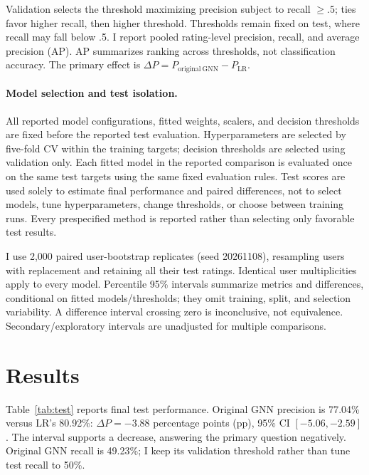 \documentclass{article}
\begin{document}
Validation selects the threshold maximizing precision subject to recall $\geq .5$; ties favor higher recall, then higher threshold. Thresholds remain fixed on test, where recall may fall below .5. I report pooled rating-level precision, recall, and average precision (AP). AP summarizes ranking across thresholds, not classification accuracy. The primary effect is $\Delta P=P_{\mathrm{original\ GNN}}-P_{\mathrm{LR}}$.

\paragraph{Model selection and test isolation.}
All reported model configurations, fitted weights, scalers, and decision thresholds are fixed before the reported test evaluation. Hyperparameters are selected by five-fold CV within the training targets; decision thresholds are selected using validation only. Each fitted model in the reported comparison is evaluated once on the same test targets using the same fixed evaluation rules. Test scores are used solely to estimate final performance and paired differences, not to select models, tune hyperparameters, change thresholds, or choose between training runs. Every prespecified method is reported rather than selecting only favorable test results.

I use 2,000 paired user-bootstrap replicates (seed 20261108), resampling users with replacement and retaining all their test ratings. Identical user multiplicities apply to every model. Percentile 95\% intervals summarize metrics and differences, conditional on fitted models/thresholds; they omit training, split, and selection variability. A difference interval crossing zero is inconclusive, not equivalence. Secondary/exploratory intervals are unadjusted for multiple comparisons.

\section{Results}
Table~\ref{tab:test} reports final test performance. Original GNN precision is 77.04\% versus LR's 80.92\%: $\Delta P=-3.88$ percentage points (pp), 95\% CI $[-5.06,-2.59]$. The interval supports a decrease, answering the primary question negatively. Original GNN recall is 49.23\%; I keep its validation threshold rather than tune test recall to 50\%.
\end{document}
